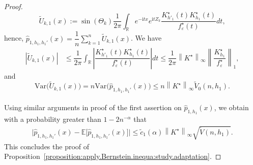 \documentclass[10pt,a4paper]{amsart}
\def\E{\mathbb{E}}
\def\R{\mathbb{R}}
\newcommand{\Var}{\mbox{Var}}
\begin{document}
\begin{proof}
	\[  
	\widetilde{U}_{k , 1}(x) := \sin(\Theta_k) \dfrac{1}{2\pi} \displaystyle{ \int_{\R} } e^{-\mathrm{i} tx} e^{\mathrm{i} t Z_{k}} \dfrac{  K_{h'_{1}}^\star(t)   K_{h_{1}}^\star(t) }{ f^{\star}_\varepsilon(t) } dt, \]
	hence, $\widehat{p}_{1,h_{1}, h_{1}'}(x) = \dfrac{1}{n}\sum_{k=1}^{n} \widetilde{U}_{k , 1}( x )$.
	We have   	
	\begin{align*} 
		\left| \widetilde{U}_{k,1} (x) \right|   
		&\leq \dfrac{1}{2\pi} \displaystyle{ \int_{\R} } \left|  \dfrac{  K_{h'_{1}}^\star(t)   K_{h_{1}}^\star(t) }{ f^{\star}_\varepsilon(t) } \right| dt  
	\leq    \dfrac{1}{2\pi}  \left\| K^{\star} \right\|_{\infty}     \left\| \dfrac{ K_{h_{1}}^\star }{ f^{\star}_\varepsilon } \right\|_{1},
	\end{align*}
	and $$\Var \big( \widetilde{U}_{k,1}(x) \big)  =  n  \Var\big(\widehat{p}_{1,h_{1},h_{1}'}(x) \big)  \leq  n  \left\| K^{\star} \right\|_{\infty} \widetilde V_{0}(n,h_{1}).$$\\
	Using similar arguments in proof of the first assertion on $\widehat{p}_{1, h_{1}}(x)$, we obtain with a probability greater than $1 - 2n^{-\alpha}$ that
	\begin{align*}
		\big| \widehat{p}_{1, h_{1} ,h_{1}'}(x) - \E \big[ \widehat{p}_{1, h_{1} ,h_{1}'}(x) \big] \big|    \leq   \tilde c_{1}(\alpha)   \left\| K^{\star} \right\|_{\infty}    \sqrt{\widetilde{V}(n,h_{1})} .
	\end{align*}
	This concludes the proof of Proposition~\ref{proposition:apply.Bernstein.inequa:study.adaptation}.
\end{proof}
\end{document}

